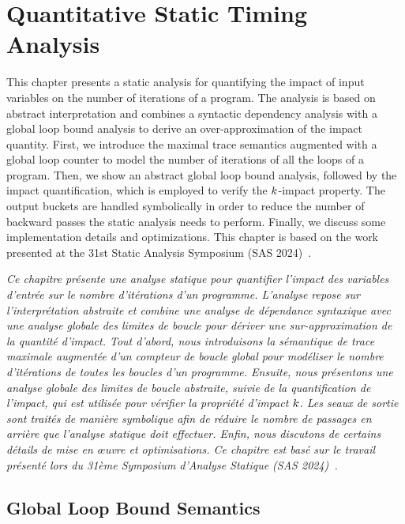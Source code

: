 \chapter{Quantitative Static Timing Analysis}

This chapter presents a static analysis for quantifying the impact of input variables on the number of iterations of a program.
The analysis is based on abstract interpretation and combines a syntactic dependency analysis with a global loop bound analysis to derive an over-approximation of the impact quantity.
First, we introduce the maximal trace semantics augmented with a global loop counter to model the number of iterations of all the loops of a program.
Then, we show an abstract global loop bound analysis, followed by the impact quantification, which is employed to verify the $k$-impact property.
The output buckets are handled symbolically in order to reduce the number of backward passes the static analysis needs to perform.
Finally, we discuss some implementation details and optimizations.
This chapter is based on the work presented at the 31st Static Analysis Symposium (SAS 2024)~\cite{Mazzucato2024sas}.

\emph{Ce chapitre présente une analyse statique pour quantifier l'impact des variables d'entrée sur le nombre d'itérations d'un programme. L'analyse repose sur l'interprétation abstraite et combine une analyse de dépendance syntaxique avec une analyse globale des limites de boucle pour dériver une sur-approximation de la quantité d'impact. Tout d'abord, nous introduisons la sémantique de trace maximale augmentée d'un compteur de boucle global pour modéliser le nombre d'itérations de toutes les boucles d'un programme. Ensuite, nous présentons une analyse globale des limites de boucle abstraite, suivie de la quantification de l'impact, qui est utilisée pour vérifier la propriété d'impact $k$. Les seaux de sortie sont traités de manière symbolique afin de réduire le nombre de passages en arrière que l'analyse statique doit effectuer. Enfin, nous discutons de certains détails de mise en œuvre et optimisations. Ce chapitre est basé sur le travail présenté lors du 31ème Symposium d'Analyse Statique (SAS 2024)~.}



\section{Global Loop Bound Semantics}


